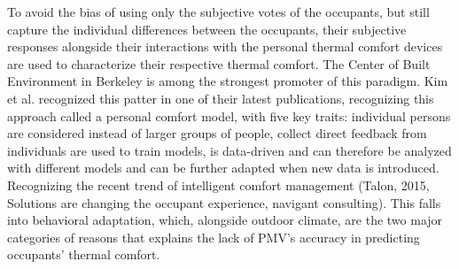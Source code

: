 
To avoid the bias of using only the subjective votes of the occupants, but still capture the individual differences between the occupants, their subjective responses alongside their interactions with the personal thermal comfort devices are used to characterize their respective thermal comfort. The Center of Built Environment in Berkeley is among the strongest promoter of this paradigm. Kim et al. recognized this patter in one of their latest publications, recognizing this approach called a personal comfort model, with five key traits: individual persons are considered instead of larger groups of people, collect direct feedback from individuals are used to train models, is data-driven and can therefore be analyzed with different models and can be further adapted when new data is introduced. Recognizing the recent trend of intelligent comfort management (Talon, 2015, Solutions are changing the occupant experience, navigant consulting). This falls into behavioral adaptation, which, alongside outdoor climate, are the two major categories of reasons that explains the lack of PMV's accuracy in predicting occupants' thermal comfort\cite{charles_fangers_2003}. 

